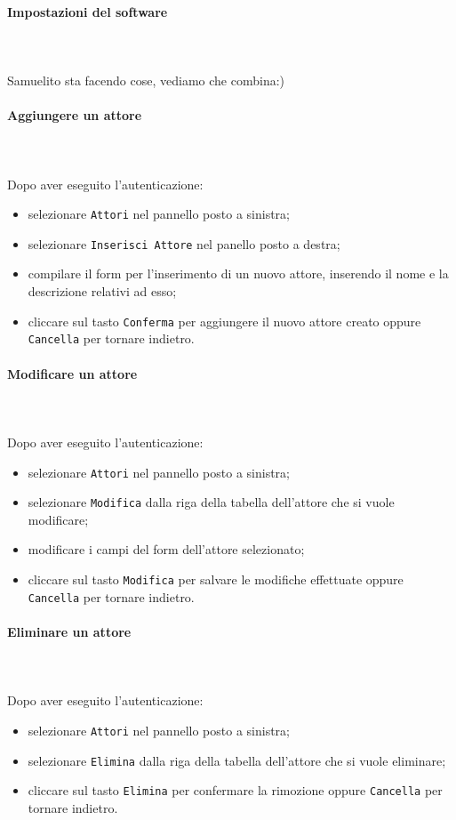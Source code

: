 \paragraph{Impostazioni del software} \mbox{}\\ \mbox{}\\
Samuelito sta facendo cose, vediamo che combina:)

\paragraph{Aggiungere un attore} \mbox{}\\ \mbox{}\\
Dopo aver eseguito l'autenticazione:
\begin{itemize}
	\item selezionare \texttt{Attori} nel pannello posto a sinistra;
	\item selezionare \texttt{Inserisci Attore} nel panello posto a destra;
	\item compilare il form per l'inserimento di un nuovo attore, inserendo 
		il nome e la descrizione relativi ad esso;
	\item cliccare sul tasto \texttt{Conferma} per aggiungere il nuovo attore 
		creato oppure \texttt{Cancella} per tornare indietro.	
\end{itemize}

\paragraph{Modificare un attore} \mbox{}\\ \mbox{}\\
Dopo aver eseguito l'autenticazione:
\begin{itemize}
	\item selezionare \texttt{Attori} nel pannello posto a sinistra;
	\item selezionare \texttt{Modifica} dalla riga della tabella dell'attore
		che si vuole modificare;
	\item modificare i campi del form dell'attore selezionato;
	\item cliccare sul tasto \texttt{Modifica} per salvare le modifiche effettuate
		oppure \texttt{Cancella} per tornare indietro.	
\end{itemize}

\paragraph{Eliminare un attore} \mbox{}\\ \mbox{}\\
Dopo aver eseguito l'autenticazione:
\begin{itemize}
	\item selezionare \texttt{Attori} nel pannello posto a sinistra;
	\item selezionare \texttt{Elimina} dalla riga della tabella dell'attore
		che si vuole eliminare;
	\item cliccare sul tasto \texttt{Elimina} per confermare la rimozione
		oppure \texttt{Cancella} per tornare indietro.	
\end{itemize}


